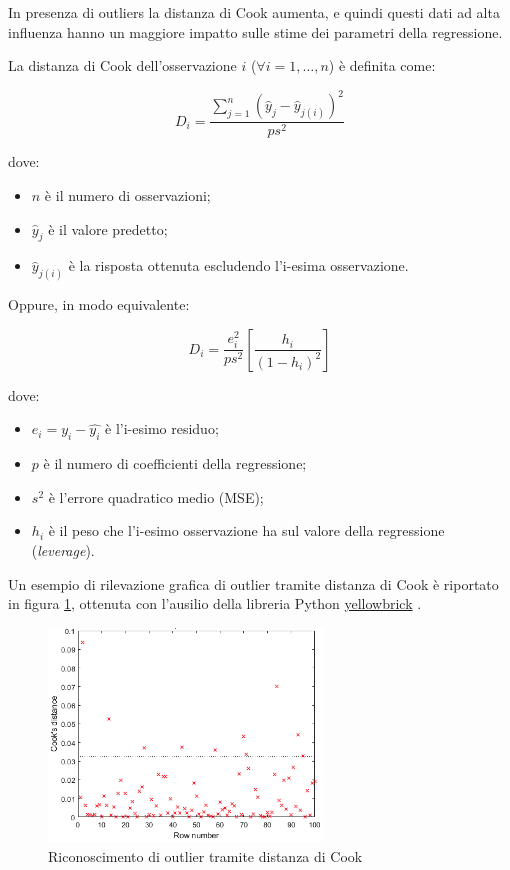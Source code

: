 In presenza di outliers la distanza di Cook aumenta, e quindi questi dati ad alta influenza hanno un maggiore impatto sulle stime dei parametri della regressione.

La distanza di Cook \cite{cook_def} dell'osservazione $i$ ($\forall i=1, \ldots, n$) è definita come:

$$D_{i}=\frac{\sum_{j=1}^{n}\left(\hat{y}_{j}-\hat{y}_{j(i)}\right)^{2}}{p s^{2}}$$\smallskip

dove:

\begin{itemize}
  \item $n$ è il numero di osservazioni;
  \item $\hat{y}_{j}$ è il valore predetto;
  \item $\hat{y}_{j(i)}$ è la risposta ottenuta escludendo l'i-esima osservazione.
\end{itemize}

Oppure, in modo equivalente:

$$D_{i}=\frac{e_{i}^2}{p s^{2}}\left[\frac{h_{i}}{\left(1-h_{i}\right)^{2}}\right]$$\smallskip

dove:

\begin{itemize}
  \item $e_{i} = y_i - \hat{y_i}$  è l'i-esimo residuo;
  \item $p$ è il numero di coefficienti della regressione;
  \item $s^2$ è l'errore quadratico medio (MSE);
  \item $h_i$ è il peso che l'i-esimo osservazione ha sul valore della regressione (\textit{leverage}).
\end{itemize}

Un esempio di rilevazione grafica di outlier tramite distanza di Cook è riportato in figura \ref{fig:cook}, ottenuta con l'ausilio della libreria Python \url{yellowbrick} \cite{yellowbrick}.

\begin{figure}[H]
\centering
\includegraphics[width=0.65\textwidth,height=\textheight,keepaspectratio]{img/cook.png}
\caption{Riconoscimento di outlier tramite distanza di Cook}
\label{fig:cook}
\end{figure}

